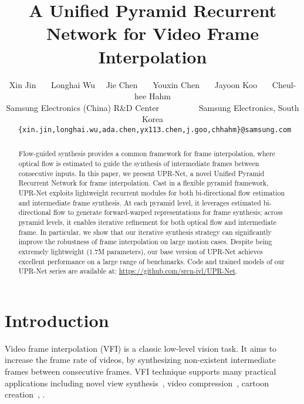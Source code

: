 \documentclass[10pt,twocolumn,letterpaper]{article}
\begin{document}
\title{A Unified Pyramid Recurrent Network for Video Frame Interpolation}



\author{Xin Jin ~~~Longhai Wu ~~Jie Chen ~~~Youxin Chen 
    ~~~Jayoon Koo ~~~Cheul-hee Hahm \\ Samsung Electronics
    (China) R\&D Center ~~~~~~~~~Samsung Electronics, South Korea \\
    {\tt\small
    \{xin.jin,longhai.wu,ada.chen,yx113.chen,j.goo,chhahm\}@samsung.com}
}



\maketitle

\begin{abstract}

    Flow-guided synthesis provides a common framework for frame interpolation,
    where optical flow is estimated to guide the synthesis of intermediate
    frames between consecutive inputs. In this paper, we present UPR-Net, a
    novel Unified Pyramid Recurrent Network for frame interpolation. Cast in a
    flexible pyramid framework, UPR-Net exploits lightweight recurrent modules
    for both bi-directional flow estimation and intermediate frame synthesis. At
    each pyramid level, it leverages estimated bi-directional flow to generate
    forward-warped representations for frame synthesis; across pyramid levels,
    it enables iterative refinement for both optical flow and intermediate
    frame. In particular, we show that our iterative synthesis strategy can
    significantly improve the robustness of frame interpolation on large motion
    cases. Despite being extremely lightweight (1.7M parameters), our base
    version of UPR-Net achieves excellent performance on a large range of
    benchmarks. Code and trained models of our UPR-Net series are available at:
    \url{https://github.com/srcn-ivl/UPR-Net}.

\end{abstract}


\section{Introduction}
\label{sec:intro}

Video frame interpolation (VFI) is a classic low-level vision task. It aims to
increase the frame rate of videos, by synthesizing non-existent intermediate
frames between consecutive frames. VFI technique supports many practical
applications including novel view synthesis~\cite{flynn2016deepstereo}, video
compression~\cite{lu2017novel}, cartoon creation~\cite{siyao2021deep}, \etc.
\end{document}
